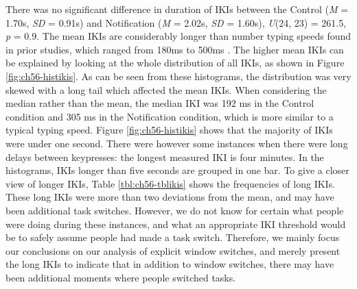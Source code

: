 There was no significant difference in duration of IKIs between the Control (\textit{M} = 1.70s, \textit{SD} = 0.91s) and Notification (\textit{M} = 2.02s, \textit{SD} = 1.60s), \textit{U}(24, 23) = 261.5, \textit{p} = 0.9. The mean IKIs are considerably longer than number typing speeds found in prior studies, which ranged from 180ms to 500ms \citep{Gould2016a}. The higher mean IKIs can be explained by looking at the whole distribution of all IKIs, as shown in Figure \ref{fig:ch56-histikis}. As can be seen from these histograms, the distribution was very skewed with a long tail which affected the mean IKIs. When considering the median rather than the mean, the median IKI was 192 ms in the Control condition and 305 ms in the Notification condition, which is more similar to a typical typing speed. Figure \ref{fig:ch56-histikis} shows that the majority of IKIs were under one second. There were however some instances when there were long delays between keypresses: the longest measured IKI is four minutes. In the histograms, IKIs longer than five seconds are grouped in one bar. To give a closer view of longer IKIs, Table \ref{tbl:ch56-tblikis}  shows the frequencies of long IKIs. These long IKIs were more than two deviations from the mean, and may have been additional task switches. However, we do not know for certain what people were doing during these instances, and what an appropriate IKI threshold would be to safely assume people had made a task switch. Therefore, we mainly focus our conclusions on our analysis of explicit window switches, and merely present the long IKIs to indicate that in addition to window switches, there may have been additional moments where people switched tasks. 

